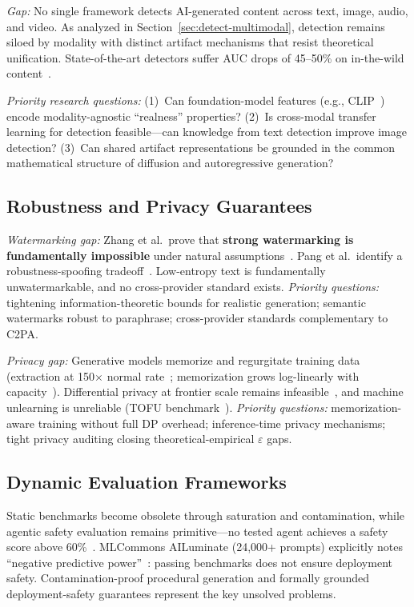 \emph{Gap:} No single framework detects AI-generated content across text, image, audio, and video. As analyzed in Section~\ref{sec:detect-multimodal}, detection remains siloed by modality with distinct artifact mechanisms that resist theoretical unification. State-of-the-art detectors suffer AUC drops of 45--50\% on in-the-wild content~\cite{chandra2025deepfakeeval}.

\emph{Priority research questions:} (1)~Can foundation-model features (e.g., CLIP~\cite{ojha2023univfd}) encode modality-agnostic ``realness'' properties? (2)~Is cross-modal transfer learning for detection feasible---can knowledge from text detection improve image detection? (3)~Can shared artifact representations be grounded in the common mathematical structure of diffusion and autoregressive generation?


\subsection{Robustness and Privacy Guarantees}
\label{sec:future-robustness}

\emph{Watermarking gap:} Zhang et al.\ prove that \textbf{strong watermarking is fundamentally impossible} under natural assumptions~\cite{zhang2024impossibility}. Pang et al.\ identify a robustness-spoofing tradeoff~\cite{pang2024nofree}. Low-entropy text is fundamentally unwatermarkable, and no cross-provider standard exists. \emph{Priority questions:} tightening information-theoretic bounds for realistic generation; semantic watermarks robust to paraphrase; cross-provider standards complementary to C2PA.

\emph{Privacy gap:} Generative models memorize and regurgitate training data (extraction at 150$\times$ normal rate~\cite{nasr2025extraction}; memorization grows log-linearly with capacity~\cite{carlini2023quantifying}). Differential privacy at frontier scale remains infeasible~\cite{tramer2024dpposition}, and machine unlearning is unreliable (TOFU benchmark~\cite{maini2024tofu}). \emph{Priority questions:} memorization-aware training without full DP overhead; inference-time privacy mechanisms; tight privacy auditing closing theoretical-empirical $\varepsilon$ gaps.


\subsection{Dynamic Evaluation Frameworks}
\label{sec:future-eval}

Static benchmarks become obsolete through saturation and contamination, while agentic safety evaluation remains primitive---no tested agent achieves a safety score above 60\%~\cite{zhang2024agentsafetybench}. MLCommons AILuminate (24,000+ prompts) explicitly notes ``negative predictive power''~\cite{ghosh2024ailuminate}: passing benchmarks does not ensure deployment safety. Contamination-proof procedural generation and formally grounded deployment-safety guarantees represent the key unsolved problems.

